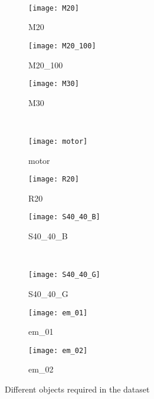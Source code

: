 \documentclass[paper=a4,11pt,parskip=half,toc=listof]{scrartcl}
\begin{document}
\begin{figure}[!htb]
\begin{subfigure}{.3\textwidth}
\end{subfigure}\\
\vspace{3mm}
\begin{subfigure}{.3\textwidth}
  \centering
  \texttt{[image: M20]}
  \caption{M20 \cite{github_robocup@work}}
  \label{fig:M20}
\end{subfigure}
\begin{subfigure}{.3\textwidth}
  \centering
  \texttt{[image: M20\_100]}
  \caption{M20\_100 \cite{github_robocup@work}}
  \label{fig:M20_100}
\end{subfigure}
\begin{subfigure}{.3\textwidth}
  \centering
  \texttt{[image: M30]}
  \caption{M30 \cite{github_robocup@work}}
  \label{fig:M30}
\end{subfigure}\\
\vspace{3mm}
\begin{subfigure}{.3\textwidth}
  \centering
  \texttt{[image: motor]}
  \caption{motor \cite{github_robocup@work}}
  \label{fig:motor}
\end{subfigure}
\begin{subfigure}{.3\textwidth}
  \centering
  \texttt{[image: R20]}
  \caption{R20 \cite{github_robocup@work}}
  \label{fig:R20}
\end{subfigure}
\begin{subfigure}{.3\textwidth}
  \centering
  \texttt{[image: S40\_40\_B]}
  \caption{S40\_40\_B \cite{github_robocup@work}}
  \label{fig:S40_40_B}
\end{subfigure}\\
\vspace{3mm}
\begin{subfigure}{.3\textwidth}
  \centering
  \texttt{[image: S40\_40\_G]}
  \caption{S40\_40\_G \cite{github_robocup@work}}
  \label{fig:S40_40_G}
\end{subfigure}
\begin{subfigure}{.3\textwidth}
  \centering
  \texttt{[image: em\_01]}
  \caption{em\_01}
  \label{fig:em_01}
\end{subfigure}
\begin{subfigure}{.3\textwidth}
  \centering
  \texttt{[image: em\_02]}
  \caption{em\_02}
  \label{fig:em_02}
\end{subfigure}
\caption{Different objects required in the dataset}
\label{Fig:objects}
\end{figure}
\end{document}
